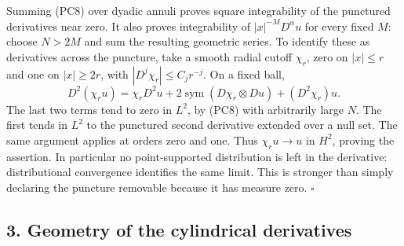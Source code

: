 \documentclass[
  11pt,
]{article}
\makeatletter
\let\ReaderOriginalAnchorStart\hyper@anchorstart
\let\ReaderOriginalAnchorEnd\hyper@anchorend
\let\ReaderPendingAliases\@empty
\def\ReaderArmAliases#1{\gdef\ReaderPendingAliases{#1}}
\def\hyper@anchorstart#1{\ReaderIfNativeAnchorTF{#1}{\ReaderPendingAliases\global\let\ReaderPendingAliases\@empty}{}\ReaderOriginalAnchorStart{#1}}
\makeatother
\begin{document}
Summing (PC8) over dyadic annuli proves square integrability of the
punctured derivatives near zero. It also proves integrability of
\(|x|^{-M}D^\alpha u\) for every fixed \(M\): choose \(N>2M\) and sum
the resulting geometric series. To identify these as derivatives across
the puncture, take a smooth radial cutoff \(\chi_r\), zero on
\(|x|\leq r\) and one on \(|x|\geq2r\), with
\(|D^j\chi_r|\leq C_jr^{-j}\). On a fixed ball, \[
D^2(\chi_ru)=\chi_rD^2u
       +2\operatorname{sym}(D\chi_r\otimes Du)+(D^2\chi_r)u.
\tag{PC11}
\] The last two terms tend to zero in \(L^2\), by (PC8) with arbitrarily
large \(N\). The first tends in \(L^2\) to the punctured second
derivative extended over a null set. The same argument applies at orders
zero and one. Thus \(\chi_ru\to u\) in \(H^2\), proving the assertion.
In particular no point-supported distribution is left in the derivative:
distributional convergence identifies the same limit. This is stronger
than simply declaring the puncture removable because it has measure
zero. \(\square\)

\ReaderArmAliases{\ReaderOriginalAnchorStart{AN03-PCU-003}\ReaderOriginalAnchorEnd\begingroup\expandafter\def\csname @currentHref\endcsname{AN03-PCU-003}\label{AN03-PCU-003}\endgroup\ReaderOriginalAnchorStart{an03-pcu-003-geometry-of-the-cylindrical-derivatives}\ReaderOriginalAnchorEnd\begingroup\expandafter\def\csname @currentHref\endcsname{an03-pcu-003-geometry-of-the-cylindrical-derivatives}\label{an03-pcu-003-geometry-of-the-cylindrical-derivatives}\endgroup\ReaderOriginalAnchorStart{3-geometry-of-the-cylindrical-derivatives}\ReaderOriginalAnchorEnd\begingroup\expandafter\def\csname @currentHref\endcsname{3-geometry-of-the-cylindrical-derivatives}\label{3-geometry-of-the-cylindrical-derivatives}\endgroup\ReaderOriginalAnchorStart{geometry-of-the-cylindrical-derivatives}\ReaderOriginalAnchorEnd}
\subsection{3. Geometry of the cylindrical
derivatives}\label{geometry-of-the-cylindrical-derivatives}
\end{document}
